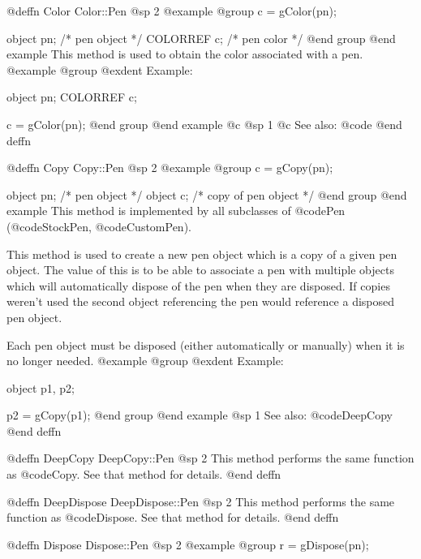 @deffn {Color} Color::Pen
@sp 2
@example
@group
c = gColor(pn);

object    pn;   /*  pen object   */
COLORREF  c;    /*  pen color    */
@end group
@end example
This method is used to obtain the color associated with a pen.
@example
@group
@exdent Example:

object    pn;
COLORREF  c;

c = gColor(pn);
@end group
@end example
@c @sp 1
@c See also:  @code{}
@end deffn










@deffn {Copy} Copy::Pen
@sp 2
@example
@group
c = gCopy(pn);

object  pn;     /*  pen object          */
object  c;      /*  copy of pen object  */
@end group
@end example
This method is implemented by all subclasses of @code{Pen}
(@code{StockPen}, @code{CustomPen}).

This method is used to create a new pen object which is a copy of a
given pen object.  The value of this is to be able to associate a
pen with multiple objects which will automatically dispose of the
pen when they are disposed.  If copies weren't used the second object
referencing the pen would reference a disposed pen object.

Each pen object must be disposed (either automatically or manually)
when it is no longer needed.
@example
@group
@exdent Example:

object  p1, p2;

p2 = gCopy(p1);
@end group
@end example
@sp 1
See also:  @code{DeepCopy}
@end deffn









@deffn {DeepCopy} DeepCopy::Pen
@sp 2
This method performs the same function as @code{Copy}.  See that
method for details.
@end deffn





@deffn {DeepDispose} DeepDispose::Pen
@sp 2
This method performs the same function as @code{Dispose}.  See that
method for details.
@end deffn







@deffn {Dispose} Dispose::Pen
@sp 2
@example
@group
r = gDispose(pn);

